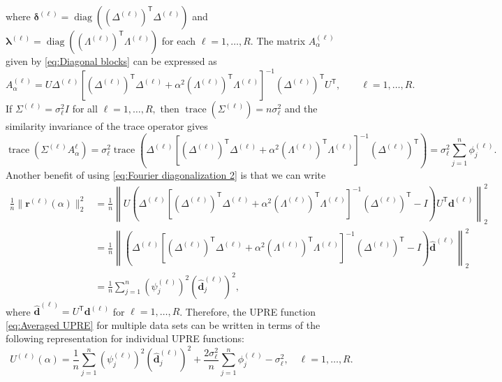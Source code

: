 \documentclass[12pt]{article}
\newcommand{\dVec}{\mathbf{d}}	%
\newcommand{\rVec}{\mathbf{r}}	%
\newcommand{\trans}[1]{{#1}^\mathsf{T}}	%
\DeclareMathOperator{\trace}{trace}		%
\DeclareMathOperator{\diag}{diag}	%
\newcommand{\dft}[1]{\widehat{#1}}	%
\newcommand{\regparam}{\alpha}
\newcommand{\filt}{\phi}
\newcommand{\mfilt}{\psi}
\newcommand{\noiseSD}{\sigma}	%
\newcommand{\A}{A_{\regparam}}	%
\newcommand{\U}{U}	%
\begin{document}
where $\bm{\delta}^{(\ell)} = \diag(\trans{(\Delta^{(\ell)})}\Delta^{(\ell)})$ and $\bm{\lambda}^{(\ell)} = \diag(\trans{(\Lambda^{(\ell)})}\Lambda^{(\ell)})$ for each $\ell = 1,\ldots,R$. The matrix $\A^{(\ell)}$ given by \eqref{eq:Diagonal blocks} can be expressed as
\begin{equation}
\label{eq:Fourier diagonalization 2}
\A^{(\ell)} = U\Delta^{(\ell)}\left[\trans{(\Delta^{(\ell)})}\Delta^{(\ell)} + \regparam^2\trans{(\Lambda^{(\ell)})}\Lambda^{(\ell)}\right]^{-1}\trans{(\Delta^{(\ell)})}\trans{U}, \qquad \ell = 1,\ldots,R.
\end{equation}
If $\Sigma^{(\ell)} = \noiseSD_\ell^2I$ for all $\ell = 1,\ldots,R,$ then $\trace(\Sigma^{(\ell)}) = n\noiseSD^2_\ell$ and the similarity invariance of the trace operator gives
\begin{equation}
\label{eq:Trace}
\trace\left(\Sigma^{(\ell)}\A^{\ell}\right) = \noiseSD_\ell^2 \trace\left(\Delta^{(\ell)}\left[\trans{(\Delta^{(\ell)})}\Delta^{(\ell)} + \regparam^2\trans{(\Lambda^{(\ell)})}\Lambda^{(\ell)}\right]^{-1}\trans{(\Delta^{(\ell)})}\right) = \noiseSD_\ell^2 \sum_{j=1}^{n} \filt^{(\ell)}_j.
\end{equation}
Another benefit of using \eqref{eq:Fourier diagonalization 2} is that we can write
\begin{align}
\frac{1}{n}\|\rVec^{(\ell)}(\regparam)\|_2^2 &= \frac{1}{n}\left\|U\left(\Delta^{(\ell)}\left[\trans{(\Delta^{(\ell)})}\Delta^{(\ell)} + \regparam^2\trans{(\Lambda^{(\ell)})}\Lambda^{(\ell)}\right]^{-1}\trans{(\Delta^{(\ell)})} - I\right)\trans{U}\dVec^{(\ell)}\right\|_2^2 \nonumber \\
&= \frac{1}{n}\left\|\left(\Delta^{(\ell)}\left[\trans{(\Delta^{(\ell)})}\Delta^{(\ell)} + \regparam^2\trans{(\Lambda^{(\ell)})}\Lambda^{(\ell)}\right]^{-1}\trans{(\Delta^{(\ell)})} - I\right)\dft{\dVec}^{(\ell)}\right\|_2^2 \nonumber \\
&= \frac{1}{n}\sum_{j=1}^{n} \left(\mfilt^{(\ell)}_j\right)^2\left(\dft{\dVec}_j^{(\ell)}\right)^2,
\label{eq:Fourier regularized residual}
\end{align}
where $\dft{\dVec}^{(\ell)} = \trans{U}\dVec^{(\ell)}$ for $\ell = 1,\ldots,R$. Therefore, the UPRE function \eqref{eq:Averaged UPRE} for multiple data sets can be written in terms of the following representation for individual UPRE functions:
\begin{equation}
\label{eq:Individual UPRE 2}
\U^{(\ell)}(\regparam) = \frac{1}{n} \sum_{j=1}^{n} \left(\mfilt^{(\ell)}_j\right)^2\left(\dft{\dVec}_j^{(\ell)}\right)^2 + \frac{2\noiseSD^2_\ell}{n} \sum_{j=1}^{n} \filt^{(\ell)}_j - \noiseSD^2_\ell, \quad \ell = 1,\ldots,R.
\end{equation}
\end{document}
